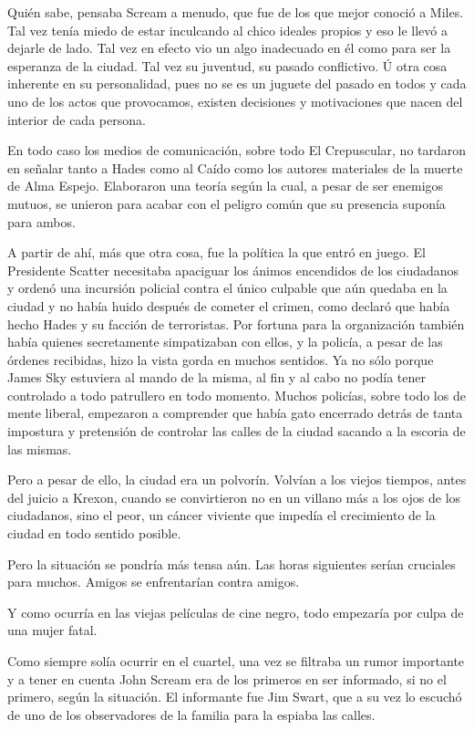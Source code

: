 Quién sabe, pensaba Scream a menudo, que fue de los que mejor conoció a Miles. Tal vez tenía miedo de estar inculcando al chico ideales propios y eso le llevó a dejarle de lado. Tal vez en efecto vio un algo inadecuado en él como para ser la esperanza de la ciudad. Tal vez su juventud, su pasado conflictivo. Ú otra cosa inherente en su personalidad, pues no se es un juguete del pasado en todos y cada uno de los actos que provocamos, existen decisiones y motivaciones que nacen del interior de cada persona.

En todo caso los medios de comunicación, sobre todo El Crepuscular, no tardaron en señalar tanto a Hades como al Caído como los autores materiales de la muerte de Alma Espejo. Elaboraron una teoría según la cual, a pesar de ser enemigos mutuos, se unieron para acabar con el peligro común que su presencia suponía para ambos.

A partir de ahí, más que otra cosa, fue la política la que entró en juego. El Presidente Scatter necesitaba apaciguar los ánimos encendidos de los ciudadanos y ordenó una incursión policial contra el único culpable que aún quedaba en la ciudad y no había huido después de cometer el crimen, como declaró que había hecho Hades y su facción de terroristas. Por fortuna para la organización también había quienes secretamente simpatizaban con ellos, y la policía, a pesar de las órdenes recibidas, hizo la vista gorda en muchos sentidos. Ya no sólo porque James Sky estuviera al mando de la misma, al fin y al cabo no podía tener controlado a todo patrullero en todo momento. Muchos policías, sobre todo los de mente liberal, empezaron a comprender que había gato encerrado detrás de tanta impostura y pretensión de controlar las calles de la ciudad sacando a la escoria de las mismas.

Pero a pesar de ello, la ciudad era un polvorín. Volvían a los viejos tiempos, antes del juicio a Krexon, cuando se convirtieron no en un villano más a los ojos de los ciudadanos, sino el peor, un cáncer viviente que impedía el crecimiento de la ciudad en todo sentido posible.

Pero la situación se pondría más tensa aún. Las horas siguientes serían cruciales para muchos. Amigos se enfrentarían contra amigos.

Y como ocurría en las viejas películas de cine negro, todo empezaría por culpa de una mujer fatal.

\parbreak
Como siempre solía ocurrir en el cuartel, una vez se filtraba un rumor importante y a tener en cuenta John Scream era de los primeros en ser informado, si no el primero, según la situación. El informante fue Jim Swart, que a su vez lo escuchó de uno de los observadores de la familia para la espiaba las calles.

